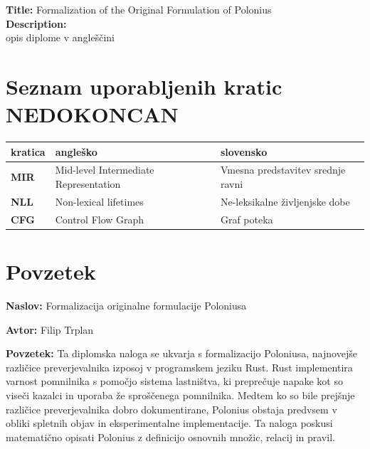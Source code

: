 \documentclass[a4paper,12pt,openright]{book}
\newcommand{\ttitle}{Formalizacija originalne formulacije Poloniusa}
\newcommand{\tauthor}{Filip Trplan}
\newcommand{\clearemptydoublepage}{\newpage{\pagestyle{empty}\cleardoublepage}}
\begin{document}
\noindent\textbf{Title:} Formalization of the Original Formulation of Polonius \\
\noindent\textbf{Description:}\\
opis diplome v angleščini
\vfill

\vspace{2cm}
\clearemptydoublepage
\pagestyle{empty}
\def\thepage{}%
\tableofcontents{}

\clearemptydoublepage
\chapter*{Seznam uporabljenih kratic NEDOKONCAN}
\noindent\begin{tabular}{p{}|p{}|p{}}    %
	{\bf kratica} & {\bf angleško}                        & {\bf slovensko}                   \\ \hline
	{\bf MIR}     & Mid-level Intermediate Representation & Vmesna predstavitev srednje ravni \\
	{\bf NLL}     & Non-lexical lifetimes                 & Ne-leksikalne življenjske dobe    \\
	{\bf CFG}     & Control Flow Graph                    & Graf poteka                       \\
\end{tabular}

\clearemptydoublepage
\chapter*{Povzetek}
\noindent\textbf{Naslov:} \ttitle
\bigskip

\noindent\textbf{Avtor:} \tauthor
\bigskip

\noindent\textbf{Povzetek:}
\noindent Ta diplomska naloga se ukvarja s formalizacijo Poloniusa, najnovejše različice preverjevalnika izposoj v programskem jeziku Rust. Rust implementira varnost pomnilnika s pomočjo sistema lastništva, ki preprečuje napake kot so viseči kazalci in uporaba že sproščenega pomnilnika. Medtem ko so bile prejšnje različice preverjevalnika dobro dokumentirane, Polonius obstaja predvsem v obliki spletnih objav in eksperimentalne implementacije. Ta naloga poskusi matematično opisati Polonius z definicijo osnovnih množic, relacij in pravil.
\bigskip
\end{document}
